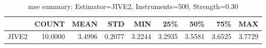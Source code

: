 \begin{table}[ht]
\centering
\caption{mse summary: Estimator=JIVE2, Instruments=500, Strength=0.30}
\begin{tabular}{lrrrrrrrr}
\toprule
 & COUNT & MEAN & STD & MIN & 25\% & 50\% & 75\% & MAX \\
\midrule
JIVE2 & 10.0000 & 3.4996 & 0.2077 & 3.2244 & 3.2935 & 3.5581 & 3.6525 & 3.7729 \\
\bottomrule
\end{tabular}
\end{table}
